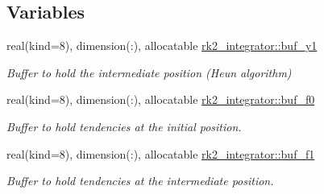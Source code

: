 \subsection*{Variables}
\begin{DoxyCompactItemize}
\item 
real(kind=8), dimension(\+:), allocatable \hyperlink{namespacerk2__integrator_a98d912c809a9e6c8026d24d5a45133cd}{rk2\+\_\+integrator\+::buf\+\_\+y1}
\begin{DoxyCompactList}\small\item\em Buffer to hold the intermediate position (Heun algorithm) \end{DoxyCompactList}\item 
real(kind=8), dimension(\+:), allocatable \hyperlink{namespacerk2__integrator_a12b35624818b9bf5056c780ec5c26737}{rk2\+\_\+integrator\+::buf\+\_\+f0}
\begin{DoxyCompactList}\small\item\em Buffer to hold tendencies at the initial position. \end{DoxyCompactList}\item 
real(kind=8), dimension(\+:), allocatable \hyperlink{namespacerk2__integrator_afdb406bf396c40211c9fd440183f0971}{rk2\+\_\+integrator\+::buf\+\_\+f1}
\begin{DoxyCompactList}\small\item\em Buffer to hold tendencies at the intermediate position. \end{DoxyCompactList}\end{DoxyCompactItemize}
